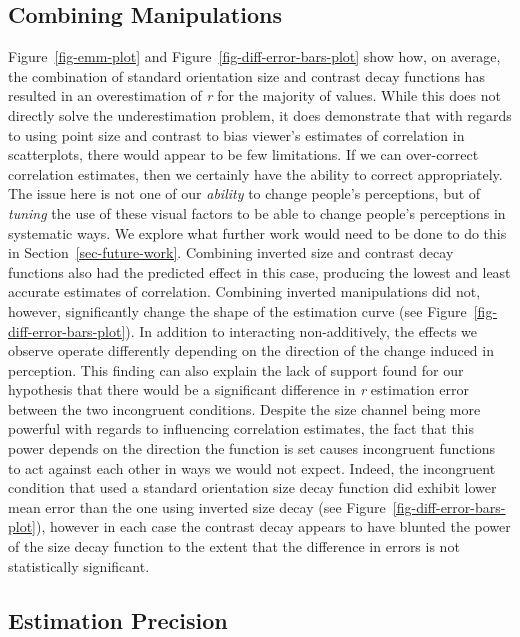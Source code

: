 \documentclass[manuscript, review, anonymous, screen]{acmart}
\begin{document}
\hypertarget{sec-combining}{%
\subsection{Combining Manipulations}\label{sec-combining}}

Figure~\ref{fig-emm-plot} and Figure~\ref{fig-diff-error-bars-plot} show
how, on average, the combination of standard orientation size and
contrast decay functions has resulted in an overestimation of \emph{r}
for the majority of values. While this does not directly solve the
underestimation problem, it does demonstrate that with regards to using
point size and contrast to bias viewer's estimates of correlation in
scatterplots, there would appear to be few limitations. If we can
over-correct correlation estimates, then we certainly have the ability
to correct appropriately. The issue here is not one of our
\emph{ability} to change people's perceptions, but of \emph{tuning} the
use of these visual factors to be able to change people's perceptions in
systematic ways. We explore what further work would need to be done to
do this in Section~\ref{sec-future-work}. Combining inverted size and
contrast decay functions also had the predicted effect in this case,
producing the lowest and least accurate estimates of correlation.
Combining inverted manipulations did not, however, significantly change
the shape of the estimation curve (see
Figure~\ref{fig-diff-error-bars-plot}). In addition to interacting
non-additively, the effects we observe operate differently depending on
the direction of the change induced in perception. This finding can also
explain the lack of support found for our hypothesis that there would be
a significant difference in \emph{r} estimation error between the two
incongruent conditions. Despite the size channel being more powerful
with regards to influencing correlation estimates, the fact that this
power depends on the direction the function is set causes incongruent
functions to act against each other in ways we would not expect. Indeed,
the incongruent condition that used a standard orientation size decay
function did exhibit lower mean error than the one using inverted size
decay (see Figure~\ref{fig-diff-error-bars-plot}), however in each case
the contrast decay appears to have blunted the power of the size decay
function to the extent that the difference in errors is not
statistically significant.

\hypertarget{estimation-precision}{%
\subsection{Estimation Precision}\label{estimation-precision}}
\end{document}
